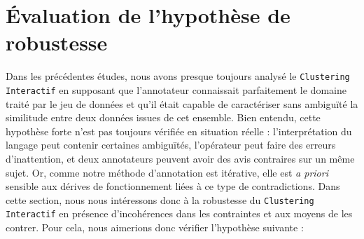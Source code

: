 \section{Évaluation de l'hypothèse de robustesse}
\label{section:4.6-HYPOTHESE-ROBUSTESSE}

	Dans les précédentes études, nous avons presque toujours analysé le \texttt{Clustering Interactif} en supposant que l'annotateur connaissait parfaitement le domaine traité par le jeu de données et qu'il était capable de caractériser sans ambiguïté la similitude entre deux données issues de cet ensemble.
	Bien entendu, cette hypothèse forte n'est pas toujours vérifiée en situation réelle : l'interprétation du langage peut contenir certaines ambiguïtés, l'opérateur peut faire des erreurs d'inattention, et deux annotateurs peuvent avoir des avis contraires sur un même sujet.
	Or, comme notre méthode d'annotation est itérative, elle est \textit{a priori} sensible aux dérives de fonctionnement liées à ce type de contradictions.
	Dans cette section, nous nous intéressons donc à la robustesse du \texttt{Clustering Interactif} en présence d'incohérences dans les contraintes et aux moyens de les contrer.
	Pour cela, nous aimerions donc vérifier l'hypothèse suivante :
	
